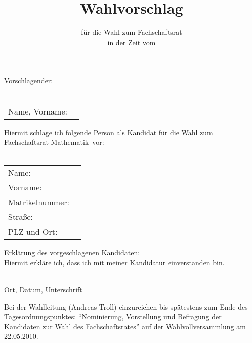 \documentclass[a4paper,10pt]{scrartcl}
\title{Wahlvorschlag}
\subtitle{für die Wahl zum Fachschaftsrat \fach \\ in der Zeit vom \zeit}
\date{}
\def\fach{Mathematik}
\def\wahlvvDatum{22.05.2010}
\begin{document}
\pagestyle{empty}
\thispagestyle{empty}
\renewcommand{\titlepagestyle}{empty}

\maketitle

Vorschlagender:
\\
\vspace{0.5cm}\\
\begin{tabularx}{\textwidth}{lX}
Name, Vorname: & \underline{\hspace{10cm}} \vspace{0.5cm}\\
\end{tabularx}
Hiermit schlage ich folgende Person als Kandidat für die Wahl zum Fachschaftsrat \fach~vor:\\
\vspace{0.5cm}\\
\begin{tabularx}{\textwidth}{lX}
Name: & \underline{\hspace{10cm}} \vspace{0.5cm}\\
Vorname:  & \underline{\hspace{10cm}} \vspace{0.5cm}\\
Matrikelnummer: & \underline{\hspace{10cm}} \vspace{0.5cm}\\ 
Straße:  & \underline{\hspace{10cm}} \vspace{0.5cm}\\
PLZ und Ort: & \underline{\hspace{10cm}} \vspace{0.5cm}\\
\end{tabularx}          
Erklärung des vorgeschlagenen Kandidaten:\\
Hiermit erkläre ich, dass ich mit meiner Kandidatur einverstanden bin.
\vspace{0.5cm}

\underline{\hspace{10cm}}\\
Ort, Datum, Unterschrift

Bei der Wahlleitung (Andreas Troll) einzureichen bis spätestens zum Ende des Tagesordnungspunktes:
``Nominierung, Vorstellung und Befragung der Kandidaten zur Wahl des Fachschaftsrates'' auf
der Wahlvollversammlung am \wahlvvDatum.
\end{document}
